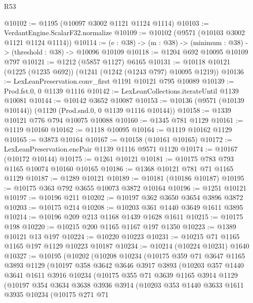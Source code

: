 \begin{lexlean}{R53}
\begin{coremodule}
@10102 := @1195 (@10097 @3002 @1121 @1124 @1114)
@10103 := VerdantEngine.ScalarF32.normalize
@10109 := @10102 (@9571 (@10103 @3002 @1121 @1124 @1114))
@10114 := (e : @38) -> (m : @38) -> (minimum : @38) -> (threshold : @38) -> @10096 @10109
@10118 := @1204 @692 @10095 @10109 @797
@10121 := @1212 (@5857 @1127) @6165
@10131 := @10118 @10121 (@1225 (@1235 @692)) (@1241 (@1242 (@1243 @797) @10095 @1219))
@10136 := LexLeanPreservation.conv_first @1191 @10121 @795 @10089
@10139 := Prod.fst.{0, 0} @1139 @1116
@10142 := LexLeanCollections.iterateUntil @1139 @10081
@10144 := @10142 @3652 @10087
@10153 := @10136 (@9571 (@10139 @10144)) (@1120 (Prod.snd.{0, 0} @1139 @1116 @10144))
@10158 := @1339 @10121 @776 @794 @10075 @10088
@10160 := @1345 @781 @1129
@10161 := @1119 @10160
@10162 := @1118 @10095
@10164 := @1119 @10162 @1129
@10165 := @3873 @10164
@10167 := @10158 (@10161 @10165)
@10172 := LexLeanPreservation.encPair @1139 @1116 @9571 @1120
@10174 := @10167 (@10172 @10144)
@10175 := @1261 @10121
@10181 := @10175 @783 @793 @1165 @10074 @10160 @10165
@10186 := @1368 @10121 @781 @71 @1165 @1129
@10187 := @1289 @10121
@10189 := @10181 (@10186 @10187)
@10195 := @10175 @363 @792 @3655 @10073 @3872 @10164
@10196 := @1251 @10121
@10197 := @10196 @211
@10202 := @10197 @362 @3650 @3654 @3896 @3872
@10203 := @10175 @214
@10208 := @10203 @361 @1440 @3649 @1611 @3895
@10214 := @10196 @209 @213 @1168 @1439 @1628 @1611
@10215 := @10175 @198
@10220 := @10215 @200 @1165 @1167 @197 @1350
@10223 := @1389 @10121 @13 @197
@10224 := @10220 @10223
@10231 := @10215 @71 @1165 @1165 @197 @1129 @10223 @10187
@10234 := @10214 (@10224 @10231) @1640
@10327 := @10195
    (@10202
      (@10208
        @10234
        (@10175
          @359
          @71
          @3647
          @1165
          @3893
          @1129
          (@10197
            @358
            @3642
            @3646
            @3917
            @3893
            (@10203
              @357
              @1440
              @3641
              @1611
              @3916
              @10234
              (@10175
                @355
                @71
                @3639
                @1165
                @3914
                @1129
                (@10197
                  @354
                  @3634
                  @3638
                  @3936
                  @3914
                  (@10203
                    @353
                    @1440
                    @3633
                    @1611
                    @3935
                    @10234
                    (@10175
                      @271
                      @71

\end{coremodule}
\end{lexlean}

